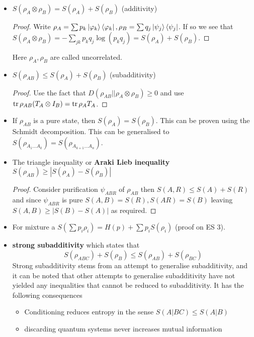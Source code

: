 \documentclass{article}
\theoremstyle{definition}
\begin{document}
\begin{itemize}
  \item $S(\rho_A \otimes \rho_B) = S(\rho_A) + S(\rho_B)$ (additivity)
    \begin{proof}
      Write $\rho_A = \sum p_k \ket{\varphi_k} \bra{\varphi_k}, \rho_B = \sum 
      q_j \ket{\psi_j} \bra{\psi_j}$. If so we see that $S(\rho_A \otimes 
      \rho_B) = -\sum_{jk} p_k q_j \log(p_k q_j) = S(\rho_A) + S(\rho_B)$.
    \end{proof}
    Here $\rho_A, \rho_B$ are called uncorrelated.
  \item $S(\rho_{AB}) \leq S(\rho_A) + S(\rho_B)$ (subadditivity)
    \begin{proof}
      Use the fact that $D(\rho_{AB} || \rho_A \otimes \rho_B) \geq 0$ and use
      $\tr \rho_{AB} (T_A \otimes I_B) = \tr \rho_A T_A$.
    \end{proof}
  \item If $\rho_{AB}$ is a pure state, then $S(\rho_A) = S(\rho_B)$. This can 
    be proven using the Schmidt decomposition. This can be generalised to 
    $S(\rho_{A_1 \dots A_k}) = S(\rho_{A_{k + 1} \dots A_n})$.
  \item The triangle inequality or \textbf{Araki Lieb inequality} $S(\rho_{AB})
    \geq |S(\rho_A) - S(\rho_B)|$
    \begin{proof}
      Consider purification $\psi_{ABR}$ of $\rho_{AB}$ then $S(A, R) \leq S(A)
      + S(R)$ and since $\psi_{ABR}$ is pure $S(A, B) = S(R), S(AR) = S(B)$ 
      leaving $S(A, B) \geq |S(B) - S(A)|$ as required.
    \end{proof}
  \item For mixture a $S(\sum p_i \rho_i) = H(p) + \sum p_i S(\rho_i)$ (proof 
    on ES 3).
  \item \textbf{strong subadditivity} which states that 
    \begin{equation}
      S(\rho_{ABC}) + S(\rho_B) \leq S(\rho_{AB}) + S(\rho_{BC})
    \end{equation}
    Strong subadditivity stems from an attempt to generalise subadditivity, and
    it can be noted that other attempts to generalise subadditivity have not 
    yielded any inequalities that cannot be reduced to subadditivity. It has the
    following consequences
    \begin{itemize}
      \item Conditioning reduces entropy in the sense $S(A | BC) \leq S(A|B)$
      \item discarding quantum systems never increases mutual information

\end{itemize}
\end{itemize}
\end{document}
